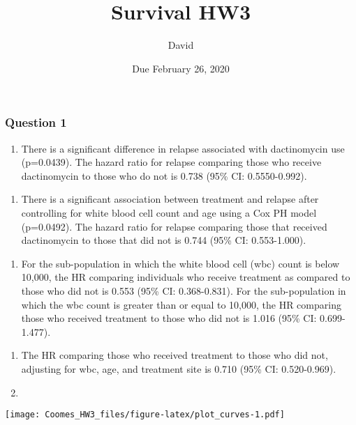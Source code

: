 \documentclass[]{article}
\title{Survival HW3}
\author{David}
\date{Due February 26, 2020}
\providecommand{\tightlist}{%
  \setlength{\itemsep}{0pt}\setlength{\parskip}{0pt}}
\begin{document}
\maketitle

\subsubsection{Question 1}\label{question-1}

\begin{enumerate}
\def\labelenumi{(\alph{enumi})}
\tightlist
\item
  There is a significant difference in relapse associated with
  dactinomycin use (p=0.0439). The hazard ratio for relapse comparing
  those who receive dactinomycin to those who do not is 0.738 (95\% CI:
  0.5550-0.992).
\end{enumerate}

\begin{enumerate}
\def\labelenumi{(\alph{enumi})}
\setcounter{enumi}{1}
\tightlist
\item
  There is a significant association between treatment and relapse after
  controlling for white blood cell count and age using a Cox PH model
  (p=0.0492). The hazard ratio for relapse comparing those that received
  dactinomycin to those that did not is 0.744 (95\% CI: 0.553-1.000).
\end{enumerate}

\begin{enumerate}
\def\labelenumi{(\alph{enumi})}
\setcounter{enumi}{2}
\tightlist
\item
  For the sub-population in which the white blood cell (wbc) count is
  below 10,000, the HR comparing individuals who receive treatment as
  compared to those who did not is 0.553 (95\% CI: 0.368-0.831). For the
  sub-population in which the wbc count is greater than or equal to
  10,000, the HR comparing those who received treatment to those who did
  not is 1.016 (95\% CI: 0.699-1.477).
\end{enumerate}

\begin{enumerate}
\def\labelenumi{(\alph{enumi})}
\setcounter{enumi}{3}
\item
  The HR comparing those who received treatment to those who did not,
  adjusting for wbc, age, and treatment site is 0.710 (95\% CI:
  0.520-0.969).
\item
\end{enumerate}

\texttt{[image: Coomes\_HW3\_files/figure-latex/plot\_curves-1.pdf]}
\end{document}
